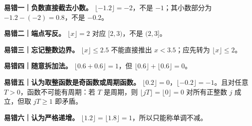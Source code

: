 \begin{trapbox}
\textbf{易错一｜负数直接截去小数。} $\lfloor-1.2\rfloor=-2$，不是 $-1$；其小数部分为 $-1.2-(-2)=0.8$，不是 $-0.2$。

\textbf{易错二｜端点写反。} $\lfloor x\rfloor=2$ 对应 $[2,3)$，不是 $(2,3]$。

\textbf{易错三｜忘记整数边界。} $\lfloor x\rfloor\le2.5$ 不能直接推出 $x<3.5$；应先转为 $\lfloor x\rfloor\le2$。

\textbf{易错四｜随意拆加法。} $\lfloor0.6+0.6\rfloor=1$，但 $\lfloor0.6\rfloor+\lfloor0.6\rfloor=0$。

\textbf{易错五｜认为取整函数是奇函数或周期函数。} $\lfloor0.2\rfloor=0$，$\lfloor-0.2\rfloor=-1$。且对任意 $T>0$，函数不可能有周期：若 $T$ 是周期，则 $\lfloor jT\rfloor=\lfloor0\rfloor=0$ 对所有正整数 $j$ 成立，但取 $jT\ge1$ 即矛盾。

\textbf{易错六｜认为严格递增。} $\lfloor1.2\rfloor=\lfloor1.8\rfloor=1$，所以只能称单调不减。
\end{trapbox}
